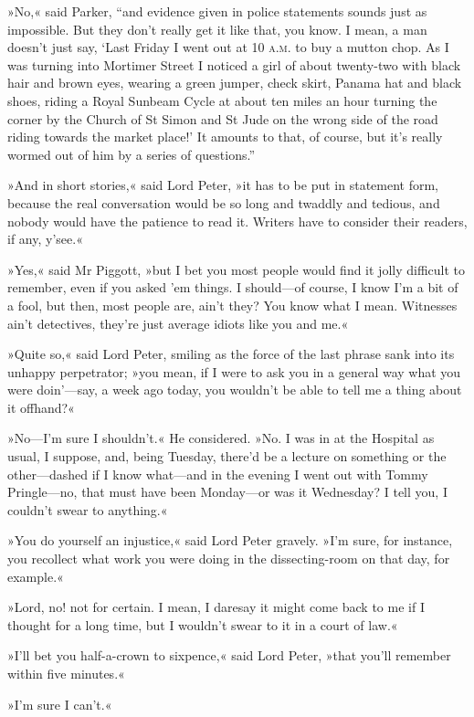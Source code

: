 »No,« said Parker, \enquote{and evidence given in police statements sounds just as impossible. But they don't really get it like that, you know. I mean, a man doesn't just say, \enquote{Last Friday I went out at 10 \textsc{a.m.} to buy a mutton chop. As I was turning into Mortimer Street I noticed a girl of about twenty-two with black hair and brown eyes, wearing a green jumper, check skirt, Panama hat and black shoes, riding a Royal Sunbeam Cycle at about ten miles an hour turning the corner by the Church of St Simon and St Jude on the wrong side of the road riding towards the market place!} It amounts to that, of course, but it's really wormed out of him by a series of questions.}

»And in short stories,« said Lord Peter, »it has to be put in statement form, because the real conversation would be so long and twaddly and tedious, and nobody would have the patience to read it. Writers have to consider their readers, if any, y'see.«

»Yes,« said Mr Piggott, »but I bet you most people would find it jolly difficult to remember, even if you asked 'em things. I should—of course, I know I'm a bit of a fool, but then, most people are, ain't they? You know what I mean. Witnesses ain't detectives, they're just average idiots like you and me.«

»Quite so,« said Lord Peter, smiling as the force of the last phrase sank into its unhappy perpetrator; »you mean, if I were to ask you in a general way what you were doin'---say, a week ago today, you wouldn't be able to tell me a thing about it offhand?«

»No—I'm sure I shouldn't.« He considered. »No. I was in at the Hospital as usual, I suppose, and, being Tuesday, there'd be a lecture on something or the other—dashed if I know what—and in the evening I went out with Tommy Pringle—no, that must have been Monday—or was it Wednesday? I tell you, I couldn't swear to anything.«

»You do yourself an injustice,« said Lord Peter gravely. »I'm sure, for instance, you recollect what work you were doing in the dissecting-room on that day, for example.«

»Lord, no! not for certain. I mean, I daresay it might come back to me if I thought for a long time, but I wouldn't swear to it in a court of law.«

»I'll bet you half-a-crown to sixpence,« said Lord Peter, »that you'll remember within five minutes.«

»I'm sure I can't.«

